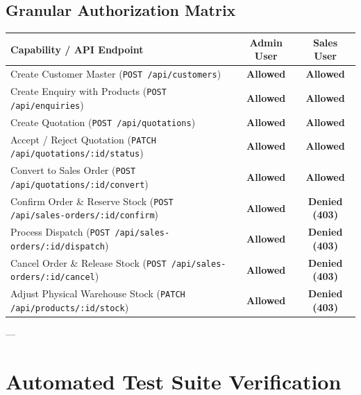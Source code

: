 \documentclass[11pt,a4paper]{article}
\begin{document}
\subsection{Granular Authorization Matrix}
\begin{table}[htbp]
\centering
\small
\begin{tabularx}{\textwidth}{X c c}
\toprule
\textbf{Capability / API Endpoint} & \textbf{Admin User} & \textbf{Sales User} \\
\midrule
Create Customer Master (\texttt{POST /api/customers}) & \textcolor{accent}{\textbf{Allowed}} & \textcolor{accent}{\textbf{Allowed}} \\
Create Enquiry with Products (\texttt{POST /api/enquiries}) & \textcolor{accent}{\textbf{Allowed}} & \textcolor{accent}{\textbf{Allowed}} \\
Create Quotation (\texttt{POST /api/quotations}) & \textcolor{accent}{\textbf{Allowed}} & \textcolor{accent}{\textbf{Allowed}} \\
Accept / Reject Quotation (\texttt{PATCH /api/quotations/:id/status}) & \textcolor{accent}{\textbf{Allowed}} & \textcolor{accent}{\textbf{Allowed}} \\
Convert to Sales Order (\texttt{POST /api/quotations/:id/convert}) & \textcolor{accent}{\textbf{Allowed}} & \textcolor{accent}{\textbf{Allowed}} \\
Confirm Order \& Reserve Stock (\texttt{POST /api/sales-orders/:id/confirm}) & \textcolor{accent}{\textbf{Allowed}} & \textcolor{danger}{\textbf{Denied (403)}} \\
Process Dispatch (\texttt{POST /api/sales-orders/:id/dispatch}) & \textcolor{accent}{\textbf{Allowed}} & \textcolor{danger}{\textbf{Denied (403)}} \\
Cancel Order \& Release Stock (\texttt{POST /api/sales-orders/:id/cancel}) & \textcolor{accent}{\textbf{Allowed}} & \textcolor{danger}{\textbf{Denied (403)}} \\
Adjust Physical Warehouse Stock (\texttt{PATCH /api/products/:id/stock}) & \textcolor{accent}{\textbf{Allowed}} & \textcolor{danger}{\textbf{Denied (403)}} \\
\bottomrule
\end{tabularx}
\end{table}

---

\section{Automated Test Suite Verification}
\end{document}
